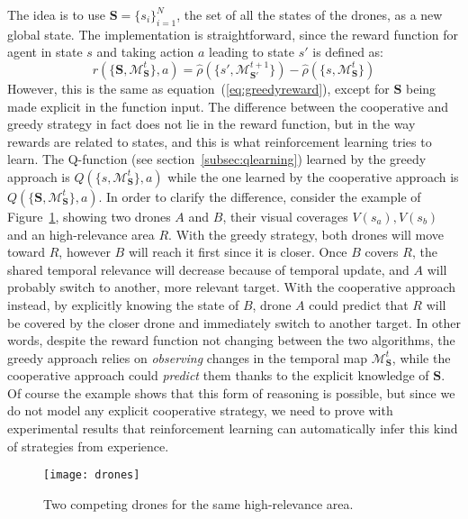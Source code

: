 \documentclass{article}
\begin{document}
The idea is to use $\mathbf{S} = \{s_i\}_{i=1}^N$, the set of all the states of the drones, as a new global state. The implementation is straightforward, since the reward function for agent in state $s$ and taking action $a$ leading to state $s'$ is defined as:
\begin{equation}
	r(\{\mathbf{S}, \mathcal{M}_\mathbf{S}^t\}, a) = 
	\hat{\rho}(\{s',\mathcal{M}_{\mathbf{S}'}^{t+1}\})-\hat{\rho}(\{s,\mathcal{M}_\mathbf{S}^{t}\})
	\label{eq:coopreward}
\end{equation}
However, this is the same as equation~(\ref{eq:greedyreward}), except for $\mathbf{S}$ being made explicit in the function input. The difference between the cooperative and greedy strategy in fact does not lie in the reward function, but in the way rewards are related to states, and this is what reinforcement learning tries to learn. The Q-function (see section~\ref{subsec:qlearning}) learned by the greedy approach is $Q(\{s,\mathcal{M}_\mathbf{S}^t\}, a)$ while the one learned by the cooperative approach is $Q(\{\mathbf{S},\mathcal{M}_\mathbf{S}^t\}, a)$. In order to clarify the difference, consider the example of Figure~\ref{fig:2drones}, showing two drones $A$ and $B$, their visual coverages $V(s_a), V(s_b)$ and an high-relevance area $R$. With the greedy strategy, both drones will move toward $R$, however $B$ will reach it first since it is closer. Once $B$ covers $R$, the shared temporal relevance will decrease because of temporal update, and $A$ will probably switch to another, more relevant target. With the cooperative approach instead, by explicitly knowing the state of $B$, drone $A$ could predict that $R$ will be covered by the closer drone and immediately switch to another target. In other words, despite the reward function not changing between the two algorithms, the greedy approach relies on \emph{observing} changes in the temporal map $\mathcal{M}^t_\mathbf{S}$, while the cooperative approach could \emph{predict} them thanks to the explicit knowledge of $\mathbf{S}$. Of course the example shows that this form of reasoning is possible, but since we do not model any explicit cooperative strategy, we need to prove with experimental results that reinforcement learning can automatically infer this kind of strategies from experience.
\begin{figure}
	\centering
	\texttt{[image: drones]}
	\caption{Two competing drones for the same high-relevance area.}
	\label{fig:2drones}
\end{figure}
\end{document}
